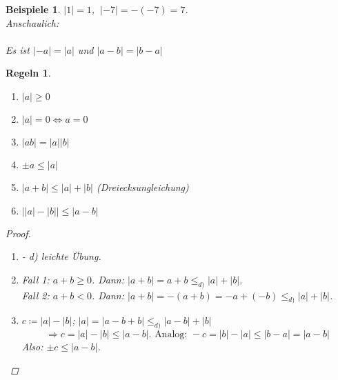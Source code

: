 \documentclass[titlepage,ngerman,a4paper,headsepline,DIV15,halfparskip*,14pt]{scrartcl}
\theoremstyle{dotless}
\newtheorem*{beispiele}{Beispiele}
\newtheorem*{regeln}{Regeln}
\begin{document}
\begin{beispiele}
	$|1| = 1$, $~|-7| = -(-7) = 7$. \\
		Anschaulich:   \\ \\
	Es ist $|-a| = |a|$ und $|a - b| = |b - a|$
\end{beispiele}


\begin{regeln}\
	\begin{enumerate}
		\item $|a| \geq 0$
		\item $|a| = 0 \iff a = 0$
		\item $|ab| = |a||b|$
		\item $\pm a \leq |a|$
		\item $|a + b| \leq |a| + |b|$ (Dreiecksungleichung)
		\item $\left| |a| - |b| \right| \leq |a - b|$
	\end{enumerate}	

	\begin{proof}\
	  \begin{enumerate}
		\item[a)]- d) leichte Übung.
		\item[e)] Fall 1: $a +b \geq 0$. Dann: $|a + b| = a + b \leq_{d)} |a| + |b|$. \\
			Fall 2: $a + b < 0$. Dann: $|a + b| = - (a + b) = - a + (- b) \leq_{d)} |a| + |b|$.
		\item[f)] $c \coloneqq |a| - |b|$; $|a| = |a - b + b| \leq_{d)} |a - b | + |b|$
			$$
				\Rightarrow c = |a| - |b| \leq |a - b|. \text{ Analog: } -c = |b| - |a| \leq |b - a| = |a - b| 
			$$
			Also: $\pm c \leq |a - b|$.
	  \end{enumerate}
	\end{proof}
\end{regeln}
\end{document}
